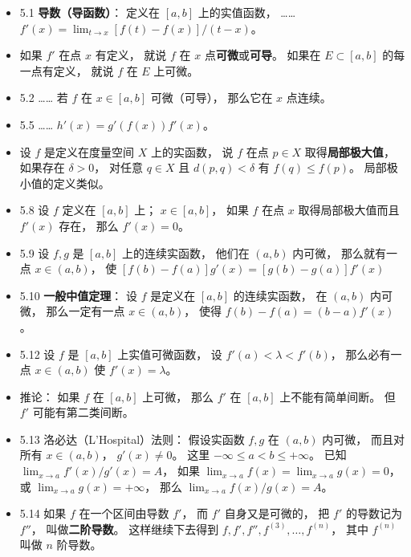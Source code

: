 \begin{itemize}
\item 5.1 \textbf{导数（导函数）}： 定义在 $[a,b]$ 上的实值函数， …… $f'(x) = \lim_{t\to x} [f(t)-f(x)]/(t-x)$。

\item 如果 $f'$ 在点 $x$ 有定义， 就说 $f$ 在 $x$ 点\textbf{可微}或\textbf{可导}。 如果在 $E\subset [a,b]$ 的每一点有定义， 就说 $f$ 在 $E$ 上可微。

\item 5.2 …… 若 $f$ 在 $x\in [a,b]$ 可微（可导）， 那么它在 $x$ 点连续。

\item 5.5 …… $h'(x) = g'(f(x))f'(x)$。

\item 设 $f$ 是定义在度量空间 $X$ 上的实函数， 说 $f$ 在点 $p\in X$ 取得\textbf{局部极大值}， 如果存在 $\delta>0$， 对任意 $q\in X$ 且 $d(p,q)<\delta$ 有 $f(q)\leqslant f(p)$。 局部极小值的定义类似。

\item 5.8 设 $f$ 定义在 $[a,b]$ 上； $x\in [a,b]$， 如果 $f$ 在点 $x$ 取得局部极大值而且 $f'(x)$ 存在， 那么 $f'(x) = 0$。

\item 5.9 设 $f,g$ 是 $[a,b]$ 上的连续实函数， 他们在 $(a,b)$ 内可微， 那么就有一点 $x\in (a,b)$， 使 $[f(b)-f(a)]g'(x) = [g(b)-g(a)]f'(x)$

\item 5.10 \textbf{一般中值定理}： 设 $f$ 是定义在 $[a,b]$ 的连续实函数， 在 $(a,b)$ 内可微， 那么一定有一点 $x\in (a,b)$， 使得 $f(b)-f(a) = (b-a)f'(x)$。

\item 5.12 设 $f$ 是 $[a,b]$ 上实值可微函数， 设 $f'(a)<\lambda<f'(b)$， 那么必有一点 $x\in (a,b)$ 使 $f'(x) = \lambda$。

\item 推论： 如果 $f$ 在 $[a,b]$ 上可微， 那么 $f'$ 在 $[a,b]$ 上不能有简单间断。 但 $f'$ 可能有第二类间断。

\item 5.13 洛必达（L'Hospital）法则： 假设实函数 $f,g$ 在 $(a,b)$ 内可微， 而且对所有 $x\in (a,b)$， $g'(x)\ne 0$。 这里 $-\infty\leqslant a<b\leqslant+\infty$。 已知 $\lim_{x\to a} f'(x)/g'(x) = A$， 如果 $\lim_{x\to a} f(x) = \lim_{x\to a} g(x) = 0$， 或 $\lim_{x\to a} g(x) = +\infty$， 那么 $\lim_{x\to a} f(x)/g(x)= A$。

\item 5.14 如果 $f$ 在一个区间由导数 $f'$， 而 $f'$ 自身又是可微的， 把 $f'$ 的导数记为 $f''$， 叫做\textbf{二阶导数}。 这样继续下去得到 $f, f', f'', f^{(3)},\dots, f^{(n)}$， 其中 $f^{(n)}$ 叫做 $n$ 阶导数。


\end{itemize}
